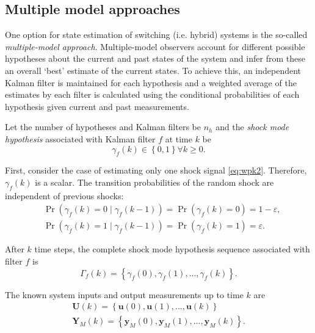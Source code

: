 {\subsection{Multiple model approaches} \label{sec:multi-model}

One option for state estimation of switching (i.e. hybrid) systems is the so-called \textit{multiple-model approach}. Multiple-model observers account for different possible hypotheses about the current and past states of the system and infer from these an overall `best' estimate of the current states. To achieve this, an independent Kalman filter is maintained for each hypothesis and a weighted average of the estimates by each filter is calculated using the conditional probabilities of each hypothesis given current and past measurements.

Let the number of hypotheses and Kalman filters be $n_h$ and the \textit{shock mode hypothesis} associated with Kalman filter $f$ at time $k$ be
%
\begin{equation} \label{eq:gammak}
	\gamma_{f}(k) \in \left\{0, 1 \right\} \forall{k \ge 0}.
\end{equation}

First, consider the case of estimating only one shock signal \eqref{eq:wpk2}. Therefore, $\gamma_f(k)$ is a scalar. The transition probabilities of the random shock are independent of previous shocks:
%
\begin{equation} \label{eq:Pr_gammak_given_gammakm1}
	\begin{aligned}
		& \Pr\left(\gamma_{f}(k)=0 \mid \gamma_{f}(k-1)\right) = \Pr\left(\gamma_{f}(k)=0\right) = 1-\varepsilon, \\
		& \Pr\left(\gamma_{f}(k)=1 \mid \gamma_{f}(k-1)\right) = \Pr\left(\gamma_{f}(k)=1\right) = \varepsilon.
	\end{aligned}
\end{equation}

After $k$ time steps, the complete shock mode hypothesis sequence associated with filter $f$ is
%
\begin{equation} \label{eq:Gammak}
	\Gamma_f(k) = \left\{ \gamma_f(0), \gamma_f(1), ..., \gamma_f(k) \right\}.
\end{equation}

The known system inputs and output measurements up to time $k$ are
%
%
%
\begin{equation} \label{eq:Uk_Yk}
	\begin{aligned}
		\mathbf{U}(k) = \left\{ \mathbf{u}(0), \mathbf{u}(1), ..., \mathbf{u}(k) \right\} \\
		\mathbf{Y}_M(k) = \left\{ \mathbf{y}_M(0), \mathbf{y}_M(1), ..., \mathbf{y}_M(k) \right\}.
	\end{aligned}
\end{equation}

}
